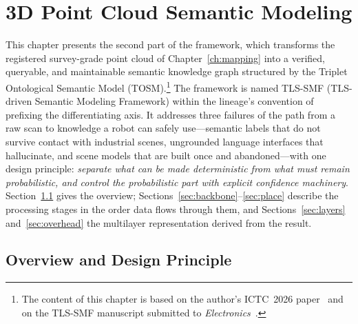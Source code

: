 \chapter{3D Point Cloud Semantic Modeling}
\label{ch:semantic}
This chapter presents the second part of the framework, which transforms the
registered survey-grade point cloud of Chapter~\ref{ch:mapping} into a
verified, queryable, and maintainable semantic knowledge graph structured by
the Triplet Ontological Semantic Model (TOSM).\footnote{The content of this chapter is based on the author's ICTC~2026 paper~\cite{kim2026ictc} and on the TLS-SMF manuscript submitted to \emph{Electronics}~\cite{kim2026electronics}.} The framework is named TLS-SMF
(TLS-driven Semantic Modeling Framework) within the lineage's convention of
prefixing the differentiating axis. It addresses three failures of the path
from a raw scan to knowledge a robot can safely use---semantic labels that do
not survive contact with industrial scenes, ungrounded language interfaces that
hallucinate, and scene models that are built once and abandoned---with one
design principle: \emph{separate what can be made deterministic from what must
remain probabilistic, and control the probabilistic part with explicit
confidence machinery}. Section~\ref{sec:smf-overview} gives the overview;
Sections~\ref{sec:backbone}--\ref{sec:place} describe the processing stages in
the order data flows through them, and Sections~\ref{sec:layers}
and~\ref{sec:overhead} the multilayer representation derived from the result.

\section{Overview and Design Principle}
\label{sec:smf-overview}

